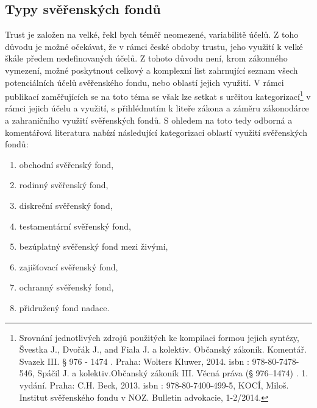 \documentclass{article}
\begin{document}
\newpage
\thispagestyle{smallertextinheader}
\subsection{Typy svěřenských fondů}




Trust je založen na velké, řekl bych téměř neomezené, variabilitě účelů. Z toho důvodu je možné očekávat, že v rámci české obdoby trustu, jeho využití k velké škále předem nedefinovaných účelů. Z tohoto důvodu není, krom zákonného vymezení, možné poskytnout celkový a komplexní list zahrnující seznam všech potenciálních účelů svěřenského fondu, nebo oblastí jejich využití. V rámci publikací zaměřujících se na toto téma se však lze setkat s určitou kategorizací\footnote{Srovnání jednotlivých zdrojů použitých ke kompilaci formou jejich syntézy, Švestka J., Dvořák J., and Fiala J. a kolektiv. Občanský zákoník. Komentář. Svazek III. § 976 - 1474 . Praha: Wolters Kluwer, 2014. isbn : 978-80-7478-546, Spáčil J. a kolektiv.Občanský zákoník III. Věcná práva (§ 976–1474) . 1. vydání. Praha: C.H. Beck, 2013. isbn : 978-80-7400-499-5, KOCÍ, Miloš. Institut svěřenského fondu v NOZ. Bulletin advokacie, 1-2/2014.} v rámci jejich účelu a využití, s přihlédnutím k liteře zákona a záměru zákonodárce a zahraničního využití svěřenských fondů. S ohledem na toto tedy odborná a komentářová literatura nabízí následující kategorizaci oblastí využití svěřenských fondů:

\begin{enumerate}
\item obchodní svěřenský fond,
\item rodinný svěřenský fond,
\item diskreční svěřenský fond,
\item testamentární svěřenský fond,
\item bezúplatný svěřenský fond mezi živými,
\item zajišťovací svěřenský fond,
\item ochranný svěřenský fond,
\item přidružený fond nadace.
\end{enumerate}
\end{document}
